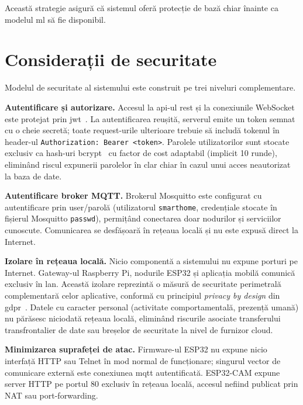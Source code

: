 Această strategie asigură că sistemul oferă protecție de bază chiar înainte ca modelul
\gls{ml} să fie disponibil.

\section{Considerații de securitate}
\label{sec:securitate}

Modelul de securitate al sistemului este construit pe trei niveluri complementare.

\textbf{Autentificare și autorizare.}
Accesul la \gls{api}-ul \gls{rest} și la conexiunile WebSocket este protejat prin
\gls{jwt}~\cite{jones2015jwt}. La autentificarea reușită, serverul emite un token semnat
cu o cheie secretă; toate request-urile ulterioare trebuie să includă tokenul în header-ul
\texttt{Authorization: Bearer <token>}. Parolele utilizatorilor sunt stocate exclusiv
ca hash-uri bcrypt~\cite{provos2003bcrypt} cu factor de cost adaptabil (implicit 10
runde), eliminând riscul expunerii parolelor în clar chiar în cazul unui acces
neautorizat la baza de date.

\textbf{Autentificare broker MQTT.}
Brokerul Mosquitto este configurat cu autentificare prin user/parolă (utilizatorul
\texttt{smarthome}, credențiale stocate în fișierul Mosquitto \texttt{passwd}),
permițând conectarea doar nodurilor și serviciilor cunoscute. Comunicarea se
desfășoară în rețeaua locală și nu este expusă direct la Internet.

\textbf{Izolare în rețeaua locală.}
Nicio componentă a sistemului nu expune porturi pe Internet. Gateway-ul Raspberry Pi,
nodurile ESP32 și aplicația mobilă comunică exclusiv în \gls{lan}. Această izolare
reprezintă o măsură de securitate perimetrală complementară celor aplicative,
conformă cu principiul \emph{privacy by design} din \gls{gdpr}~\cite{gdpr2016}.
Datele cu caracter personal (activitate comportamentală, prezență umană) nu
părăsesc niciodată rețeaua locală, eliminând riscurile asociate transferului
transfrontalier de date sau breșelor de securitate la nivel de furnizor cloud.

\textbf{Minimizarea suprafeței de atac.}
Firmware-ul ESP32 nu expune nicio interfață HTTP sau Telnet în mod normal de funcționare;
singurul vector de comunicare externă este conexiunea \gls{mqtt} autentificată.
ESP32-CAM expune server HTTP pe portul 80 exclusiv în rețeaua locală, accesul nefiind
publicat prin NAT sau port-forwarding.
